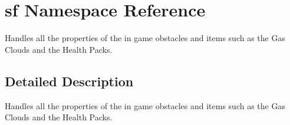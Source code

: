 \hypertarget{namespacesf}{}\section{sf Namespace Reference}
\label{namespacesf}


Handles all the properties of the in game obstacles and items such as the Gas Clouds and the Health Packs.  




\subsection{Detailed Description}
Handles all the properties of the in game obstacles and items such as the Gas Clouds and the Health Packs. 

